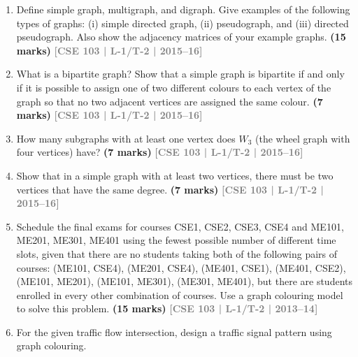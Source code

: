 \documentclass[12pt,a3paper]{article}
\newcommand{\yr}[1]{\hfill\textcolor{gray}{\small\textbf{[#1]}}}
\newcommand{\mk}[1]{\textcolor{orange!70!black}{\small\textbf{(#1 marks)}}}
\begin{document}
\begin{enumerate}
\begin{center}
\end{center}

\mk{6} \yr{CSE 103 | L-1/T-2 | 2015--16}

\item Define simple graph, multigraph, and digraph. Give examples of the following types of graphs: (i) simple directed graph, (ii) pseudograph, and (iii) directed pseudograph. Also show the adjacency matrices of your example graphs.
\mk{15} \yr{CSE 103 | L-1/T-2 | 2015--16}

\item What is a bipartite graph? Show that a simple graph is bipartite if and only if it is possible to assign one of two different colours to each vertex of the graph so that no two adjacent vertices are assigned the same colour.
\mk{7} \yr{CSE 103 | L-1/T-2 | 2015--16}

\item How many subgraphs with at least one vertex does $W_3$ (the wheel graph with four vertices) have?
\mk{7} \yr{CSE 103 | L-1/T-2 | 2015--16}

\item Show that in a simple graph with at least two vertices, there must be two vertices that have the same degree.
\mk{7} \yr{CSE 103 | L-1/T-2 | 2015--16}

\item Schedule the final exams for courses CSE1, CSE2, CSE3, CSE4 and ME101, ME201, ME301, ME401 using the fewest possible number of different time slots, given that there are no students taking both of the following pairs of courses: (ME101, CSE4), (ME201, CSE4), (ME401, CSE1), (ME401, CSE2), (ME101, ME201), (ME101, ME301), (ME301, ME401), but there are students enrolled in every other combination of courses. Use a graph colouring model to solve this problem.
\mk{15} \yr{CSE 103 | L-1/T-2 | 2013--14}

\item For the given traffic flow intersection, design a traffic signal pattern using graph colouring.

\begin{center}
\end{center}
\end{enumerate}
\end{document}
